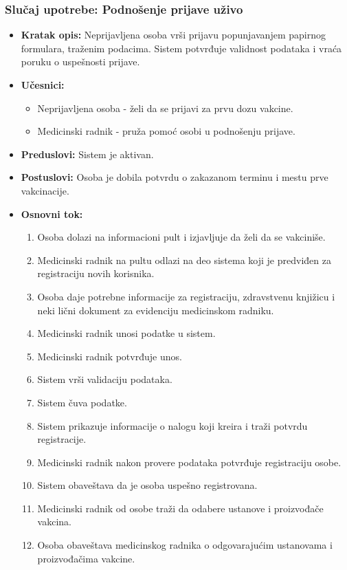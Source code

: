 \documentclass[titlepage]{article}
\begin{document}
\subsubsection{Slučaj upotrebe: Podnošenje prijave uživo}
\begin{itemize}
    \item \textbf{Kratak opis:} Neprijavljena osoba vrši prijavu popunjavanjem papirnog formulara, traženim podacima. Sistem potvrđuje validnost podataka i vraća poruku o uspešnosti prijave.
    \item \textbf{Učesnici:}
        \begin{itemize}
            \item Neprijavljena osoba - želi da se prijavi za prvu dozu vakcine.
	    \item Medicinski radnik - pruža pomoć osobi u podnošenju prijave.
        \end{itemize}
    \item \textbf{Preduslovi:} Sistem je aktivan.
    \item \textbf{Postuslovi:} Osoba je dobila potvrdu o zakazanom terminu i mestu prve vakcinacije.
    \item \textbf{Osnovni tok:}
        \begin{enumerate}
            \item Osoba dolazi na informacioni pult i izjavljuje da želi da se vakciniše.
	    \item Medicinski radnik na pultu odlazi na deo sistema koji je predviđen za registraciju novih korisnika.
	    \item Osoba daje potrebne informacije za registraciju, zdravstvenu knjižicu i neki lični dokument za evidenciju medicinskom radniku.
	    \item Medicinski radnik unosi podatke u sistem.
	    \item Medicinski radnik potvrđuje unos.
	    \item Sistem vrši validaciju podataka.
            \item Sistem čuva podatke.
            \item Sistem prikazuje informacije o nalogu koji kreira i traži potvrdu registracije.
	    \item Medicinski radnik nakon provere podataka potvrđuje registraciju osobe.
            \item Sistem obaveštava da je osoba uspešno registrovana.
	    \item Medicinski radnik od osobe traži da odabere ustanove i proizvođače vakcina.
	    \item Osoba obaveštava medicinskog radnika o odgovarajućim ustanovama i proizvođačima vakcine.

\end{enumerate}
\end{itemize}
\end{document}
